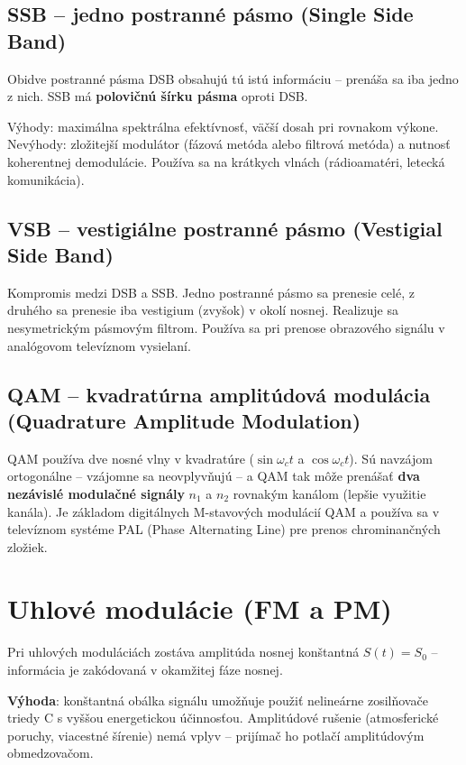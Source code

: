 \subsection{SSB -- jedno postranné pásmo (Single Side Band)}

Obidve postranné pásma DSB obsahujú tú istú informáciu -- prenáša sa iba jedno z
nich. SSB má \textbf{polovičnú šírku pásma} oproti DSB.

Výhody: maximálna spektrálna efektívnosť, väčší dosah pri rovnakom výkone.
Nevýhody: zložitejší modulátor (fázová metóda alebo filtrová metóda) a nutnosť
koherentnej demodulácie. Používa sa na krátkych vlnách (rádioamatéri, letecká
komunikácia).

\subsection{VSB -- vestigiálne postranné pásmo (Vestigial Side Band)}

Kompromis medzi DSB a SSB. Jedno postranné pásmo sa prenesie celé, z druhého
sa prenesie iba vestigium (zvyšok) v okolí nosnej. Realizuje sa nesymetrickým
pásmovým filtrom. Používa sa pri prenose obrazového signálu v analógovom
televíznom vysielaní.

\subsection{QAM -- kvadratúrna amplitúdová modulácia (Quadrature Amplitude Modulation)}

QAM používa dve nosné vlny v kvadratúre ($\sin\omega_c t$ a $\cos\omega_c t$).
Sú navzájom ortogonálne -- vzájomne sa neovplyvňujú -- a QAM tak môže prenášať
\textbf{dva nezávislé modulačné signály} $n_1$ a $n_2$ rovnakým kanálom (lepšie
využitie kanála). Je základom digitálnych M-stavových modulácií QAM a používa
sa v televíznom systéme PAL (Phase Alternating Line) pre prenos chrominančných
zložiek.

\section{Uhlové modulácie (FM a PM)}

Pri uhlových moduláciách zostáva amplitúda nosnej konštantná $S(t) = S_0$ --
informácia je zakódovaná v okamžitej fáze nosnej.

\textbf{Výhoda}: konštantná obálka signálu umožňuje použiť nelineárne zosilňovače
triedy C s vyššou energetickou účinnosťou. Amplitúdové rušenie (atmosferické
poruchy, viacestné šírenie) nemá vplyv -- prijímač ho potlačí amplitúdovým
obmedzovačom.

